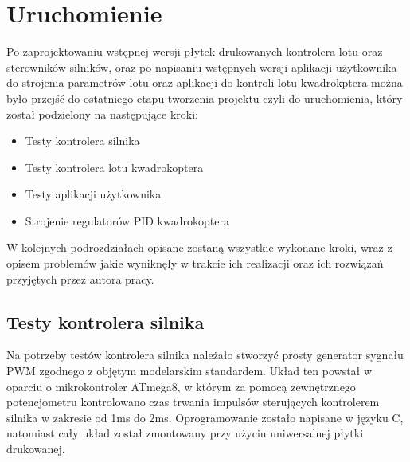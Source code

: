
\chapter{Uruchomienie} %

\label{Chapter7} %


Po zaprojektowaniu wstępnej wersji płytek drukowanych kontrolera lotu oraz sterowników silników, oraz po napisaniu wstępnych wersji aplikacji użytkownika do strojenia parametrów lotu oraz aplikacji do kontroli lotu kwadrokptera można było przejść do ostatniego etapu tworzenia projektu czyli do uruchomienia, który został podzielony na następujące kroki:

\begin{itemize}
	\item Testy kontrolera silnika
	\item Testy kontrolera lotu kwadrokoptera
	\item Testy aplikacji użytkownika
	\item Strojenie regulatorów PID kwadrokoptera
\end{itemize} 

W kolejnych podrozdziałach opisane zostaną wszystkie wykonane kroki, wraz z opisem problemów jakie wyniknęły w trakcie ich realizacji oraz ich rozwiązań przyjętych przez autora pracy.

\section{Testy kontrolera silnika}

Na potrzeby testów kontrolera silnika należało stworzyć prosty generator sygnału PWM zgodnego z objętym modelarskim standardem. Układ ten powstał w oparciu o mikrokontroler ATmega8, w którym za pomocą zewnętrznego potencjometru kontrolowano czas trwania impulsów sterujących kontrolerem silnika w zakresie od 1ms do 2ms. Oprogramowanie zostało napisane w języku C, natomiast cały układ został zmontowany przy użyciu uniwersalnej płytki drukowanej.

